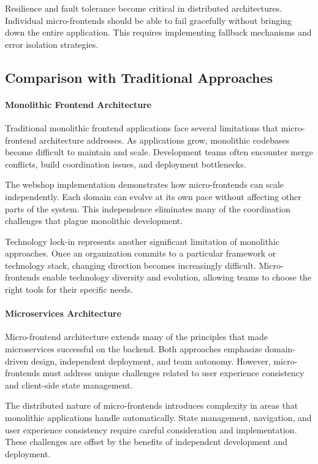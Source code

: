 \documentclass[12pt,a4paper]{report}
\begin{document}
Resilience and fault tolerance become critical in distributed architectures. Individual micro-frontends should be able to fail gracefully without bringing down the entire application. This requires implementing fallback mechanisms and error isolation strategies.

\subsection*{Comparison with Traditional Approaches}

\paragraph{Monolithic Frontend Architecture}

Traditional monolithic frontend applications face several limitations that micro-frontend architecture addresses. As applications grow, monolithic codebases become difficult to maintain and scale. Development teams often encounter merge conflicts, build coordination issues, and deployment bottlenecks.

The webshop implementation demonstrates how micro-frontends can scale independently. Each domain can evolve at its own pace without affecting other parts of the system. This independence eliminates many of the coordination challenges that plague monolithic development.

Technology lock-in represents another significant limitation of monolithic approaches. Once an organization commits to a particular framework or technology stack, changing direction becomes increasingly difficult. Micro-frontends enable technology diversity and evolution, allowing teams to choose the right tools for their specific needs.

\paragraph{Microservices Architecture}

Micro-frontend architecture extends many of the principles that made microservices successful on the backend. Both approaches emphasize domain-driven design, independent deployment, and team autonomy. However, micro-frontends must address unique challenges related to user experience consistency and client-side state management.

The distributed nature of micro-frontends introduces complexity in areas that monolithic applications handle automatically. State management, navigation, and user experience consistency require careful consideration and implementation. These challenges are offset by the benefits of independent development and deployment.
\end{document}
